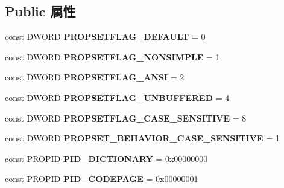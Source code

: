 \subsection*{Public 属性}
\begin{DoxyCompactItemize}
\item 
\mbox{\label{interface_i_property_storage_a28a8603ac4e26f893fa4e6b8e4d2df73}} 
const D\+W\+O\+RD {\bfseries P\+R\+O\+P\+S\+E\+T\+F\+L\+A\+G\+\_\+\+D\+E\+F\+A\+U\+LT} = 0
\item 
\mbox{\label{interface_i_property_storage_a8dea32aa1de4aca9ce95511a9ee42b80}} 
const D\+W\+O\+RD {\bfseries P\+R\+O\+P\+S\+E\+T\+F\+L\+A\+G\+\_\+\+N\+O\+N\+S\+I\+M\+P\+LE} = 1
\item 
\mbox{\label{interface_i_property_storage_a160f625faa8f2bff8ba9b8ea7b605509}} 
const D\+W\+O\+RD {\bfseries P\+R\+O\+P\+S\+E\+T\+F\+L\+A\+G\+\_\+\+A\+N\+SI} = 2
\item 
\mbox{\label{interface_i_property_storage_a1f75ec16d7c485470bb580098bf8c52c}} 
const D\+W\+O\+RD {\bfseries P\+R\+O\+P\+S\+E\+T\+F\+L\+A\+G\+\_\+\+U\+N\+B\+U\+F\+F\+E\+R\+ED} = 4
\item 
\mbox{\label{interface_i_property_storage_a14760ae73e94ab869cbac3d96e1c5488}} 
const D\+W\+O\+RD {\bfseries P\+R\+O\+P\+S\+E\+T\+F\+L\+A\+G\+\_\+\+C\+A\+S\+E\+\_\+\+S\+E\+N\+S\+I\+T\+I\+VE} = 8
\item 
\mbox{\label{interface_i_property_storage_a2d6d19d25436fcee1c9155a6d044ef2b}} 
const D\+W\+O\+RD {\bfseries P\+R\+O\+P\+S\+E\+T\+\_\+\+B\+E\+H\+A\+V\+I\+O\+R\+\_\+\+C\+A\+S\+E\+\_\+\+S\+E\+N\+S\+I\+T\+I\+VE} = 1
\item 
\mbox{\label{interface_i_property_storage_a6097d785c44dd2274e714fbef62b465c}} 
const P\+R\+O\+P\+ID {\bfseries P\+I\+D\+\_\+\+D\+I\+C\+T\+I\+O\+N\+A\+RY} = 0x00000000
\item 
\mbox{\label{interface_i_property_storage_af272676a7392e62cdecfac2d342e141c}} 
const P\+R\+O\+P\+ID {\bfseries P\+I\+D\+\_\+\+C\+O\+D\+E\+P\+A\+GE} = 0x00000001

\end{DoxyCompactItemize}
